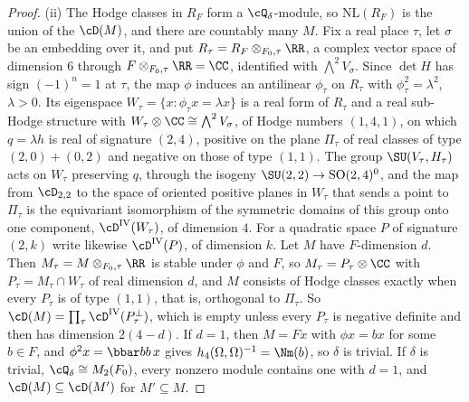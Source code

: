 \begin{proof}
(ii) The Hodge classes in $R_{F}$ form a $\cQ_{\delta}$-module, so
$\mathrm{NL}(R_{F})$ is the union of the $\cD(M)$, and there are countably
many $M$. Fix a real place $\tau$, let $\sigma$ be an embedding over it, and
put $R_{\tau}=R_{F}\otimes_{F_{0},\tau}\RR$, a complex vector space of
dimension $6$ through $F\otimes_{F_{0},\tau}\RR=\CC$, identified with
$\bigwedge^{2}V_{\sigma}$. Since $\det H$ has sign $(-1)^{n}=1$ at $\tau$, the
map $\phi$ induces an antilinear $\phi_{\tau}$ on $R_{\tau}$ with
$\phi_{\tau}^{2}=\lambda^{2}$, $\lambda>0$. Its eigenspace
$W_{\tau}=\{x:\phi_{\tau}x=\lambda x\}$ is a real form of $R_{\tau}$ and a real
sub-Hodge structure with $W_{\tau}\otimes\CC\cong\bigwedge^{2}V_{\sigma}$, of
Hodge numbers $(1,4,1)$, on which $q=\lambda h$ is real of signature $(2,4)$,
positive on the plane $\Pi_{\tau}$ of real classes of type $(2,0)+(0,2)$ and
negative on those of type $(1,1)$. The group $\SU(V_{\tau},H_{\tau})$ acts on
$W_{\tau}$ preserving $q$, through the isogeny $\SU(2,2)\to\mathrm{SO}(2,4)^{0}$,
and the map from $\cD_{2,2}$ to the space of oriented positive planes in
$W_{\tau}$ that sends a point to $\Pi_{\tau}$ is the equivariant isomorphism of
the symmetric domains of this group onto one component,
$\cD^{\mathrm{IV}}(W_{\tau})$, of dimension $4$. For a quadratic space $P$ of
signature $(2,k)$ write likewise $\cD^{\mathrm{IV}}(P)$, of dimension $k$. Let
$M$ have $F$-dimension $d$. Then $M_{\tau}=M\otimes_{F_{0},\tau}\RR$ is stable
under $\phi$ and $F$, so $M_{\tau}=P_{\tau}\otimes\CC$ with
$P_{\tau}=M_{\tau}\cap W_{\tau}$ of real dimension $d$, and $M$ consists of
Hodge classes exactly when every $P_{\tau}$ is of type $(1,1)$, that is,
orthogonal to $\Pi_{\tau}$. So
$\cD(M)=\prod_{\tau}\cD^{\mathrm{IV}}(P_{\tau}^{\perp})$, which is empty unless
every $P_{\tau}$ is negative definite and then has dimension $2(4-d)$. If
$d=1$, then $M=Fx$ with $\phi x=bx$ for some $b\in F$, and
$\phi^{2}x=\bbar bb\,x$ gives $h_{4}(\Omega,\Omega)^{-1}=\Nm(b)$, so $\delta$ is
trivial. If $\delta$ is trivial, $\cQ_{\delta}\cong M_{2}(F_{0})$, every nonzero
module contains one with $d=1$, and $\cD(M)\subseteq\cD(M')$ for
$M'\subseteq M$.


\end{proof}
